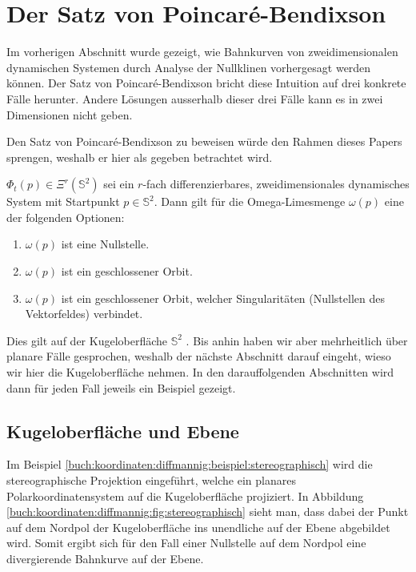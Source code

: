 \section{Der Satz von Poincaré-Bendixson} \label{poinbendix:section:poinbendix}
Im vorherigen Abschnitt wurde gezeigt, wie Bahnkurven von zweidimensionalen dynamischen Systemen durch Analyse der Nullklinen vorhergesagt werden können.
Der Satz von Poincaré-Bendixson bricht diese Intuition auf drei konkrete Fälle herunter.
Andere Lösungen ausserhalb dieser drei Fälle kann es in zwei Dimensionen nicht geben.

Den Satz von Poincaré-Bendixson zu beweisen würde den Rahmen dieses Papers sprengen, weshalb er hier als gegeben betrachtet wird.


\begin{satz}
\label{poinbendix:satz:poinbendix}
$\Phi_t(p) \in \Xi^r(\mathbb{S}^2)$ sei ein $r$-fach differenzierbares, zweidimensionales dynamisches System mit Startpunkt $p \in \mathbb{S}^2$.
Dann gilt für die Omega-Limesmenge $\omega(p)$ eine der folgenden Optionen:
\begin{enumerate}
\item $\omega(p)$ ist eine Nullstelle.
\item $\omega(p)$ ist ein geschlossener Orbit.
\item $\omega(p)$ ist ein geschlossener Orbit, welcher Singularitäten (Nullstellen des Vektorfeldes) verbindet.
\end{enumerate}
\end{satz}

Dies gilt auf der Kugeloberfläche $\mathbb{S}^2$ \cite{poinbendix:melo}.
Bis anhin haben wir aber mehrheitlich über planare Fälle gesprochen, weshalb der nächste Abschnitt darauf eingeht, wieso wir hier die Kugeloberfläche nehmen.
In den darauffolgenden Abschnitten wird dann für jeden Fall jeweils ein Beispiel gezeigt.

\subsection{Kugeloberfläche und Ebene} \label{poinbendix:subsection:kugeloberflaeche}

Im Beispiel \ref{buch:koordinaten:diffmannig:beispiel:stereographisch} wird die stereographische Projektion eingeführt, welche ein planares Polarkoordinatensystem auf die Kugeloberfläche projiziert.
%
In Abbildung \ref{buch:koordinaten:diffmannig:fig:stereographisch} sieht man, dass dabei der Punkt auf dem Nordpol der Kugeloberfläche ins unendliche auf der Ebene abgebildet wird.
Somit ergibt sich für den Fall einer Nullstelle auf dem Nordpol eine divergierende Bahnkurve auf der Ebene.

